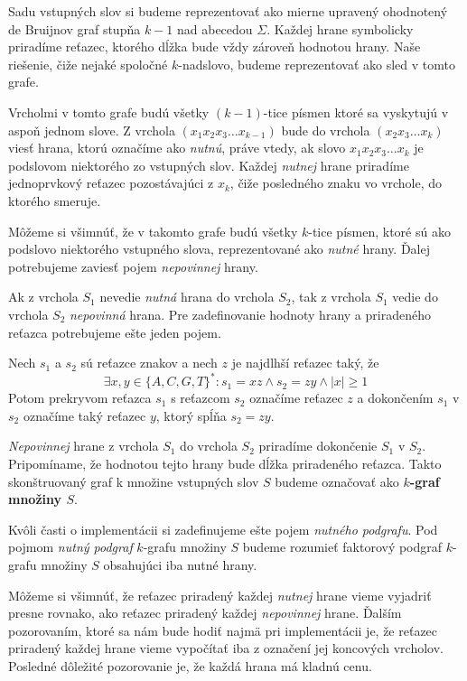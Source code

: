 Sadu vstupných slov si budeme reprezentovať ako mierne upravený ohodnotený de Bruijnov graf stupňa $k - 1$ nad
abecedou $\Sigma$. Každej hrane symbolicky priradíme reťazec, ktorého dĺžka bude
vždy zároveň hodnotou hrany.
Naše riešenie, čiže nejaké spoločné $k$-nadslovo, budeme reprezentovať ako sled v tomto grafe.

Vrcholmi v tomto grafe budú všetky $(k - 1)$-tice písmen ktoré sa vyskytujú v aspoň jednom slove.
Z vrchola $\left(x_1 x_2 x_3 \ldots x_{k-1}\right)$ bude do vrchola $\left(x_2 x_3 \ldots x_k\right)$
viesť hrana, ktorú označíme ako \emph{nutnú},
práve vtedy, ak slovo $x_1 x_2 x_3 \ldots x_k$ je podslovom niektorého zo
vstupných slov. Každej \emph{nutnej} hrane priradíme jednoprvkový reťazec pozostávajúci z $x_k$, čiže
posledného znaku vo vrchole, do ktorého smeruje.

Môžeme si všimnúť, že v takomto grafe budú všetky $k$-tice písmen, ktoré sú
ako podslovo niektorého vstupného slova, reprezentované ako \emph{nutné} hrany. Ďalej
potrebujeme zaviesť pojem \emph{nepovinnej} hrany.

Ak z vrchola $S_1$ nevedie \emph{nutná} hrana do vrchola $S_2$, tak z vrchola
$S_1$ vedie do vrchola $S_2$ \emph{nepovinná} hrana. Pre zadefinovanie hodnoty
hrany a priradeného reťazca potrebujeme ešte jeden pojem.

\begin{defn}
Nech $s_1$ a $s_2$ sú reťazce znakov a nech $z$ je najdlhší reťazec taký, že
$$\exists x, y \in \{A, C, G, T\}^*: s_1 = xz \wedge s_2 = zy \wedge |x| \ge 1 $$
Potom prekryvom reťazca $s_1$ s reťazcom $s_2$ označíme reťazec $z$ a dokončením $s_1$ v $s_2$ označíme
taký reťazec $y$, ktorý spĺňa $s_2 = zy$.
\end{defn}

\emph{Nepovinnej} hrane z vrchola $S_1$ do vrchola $S_2$ priradíme dokončenie $S_1$ v
$S_2$. Pripomíname, že hodnotou tejto hrany bude dĺžka priradeného reťazca.
Takto skonštruovaný graf k množine vstupných slov $S$ budeme označovať ako
\textbf{\boldmath$k$-graf množiny \boldmath$S$}.

Kvôli časti o implementácii si zadefinujeme ešte pojem \emph{nutného podgrafu}.
Pod pojmom \emph{nutný podgraf} $k$-grafu množiny $S$ budeme rozumieť faktorový
podgraf $k$-grafu množiny $S$ obsahujúci iba nutné hrany.

Môžeme si všimnúť, že reťazec priradený každej \emph{nutnej} hrane vieme vyjadriť
presne rovnako, ako reťazec priradený každej \emph{nepovinnej} hrane. Ďalším pozorovaním,
ktoré sa nám bude hodiť najmä pri implementácii je, že reťazec priradený každej
hrane vieme vypočítať iba z označení jej koncových vrcholov. Posledné dôležité
pozorovanie je, že každá hrana má kladnú cenu.

